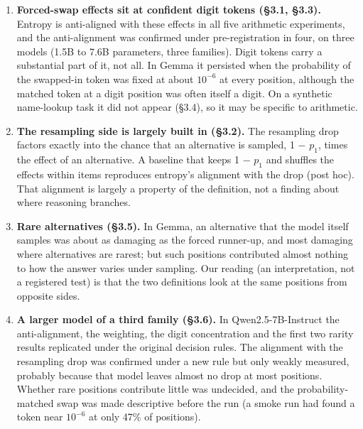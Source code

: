 \documentclass[
  10pt,
  a4paper,
]{article}
\providecommand{\tightlist}{%
  \setlength{\itemsep}{0pt}\setlength{\parskip}{0pt}}
\begin{document}
\begin{enumerate}
\def\labelenumi{\arabic{enumi}.}
\tightlist
\item
  \textbf{Forced-swap effects sit at confident digit tokens (§3.1, §3.3).} Entropy is anti-aligned with these effects in all five arithmetic experiments, and the anti-alignment was confirmed under
  pre-registration in four, on three models (1.5B to 7.6B parameters, three families). Digit tokens carry a substantial part of it, not all. In Gemma it persisted when the probability of the
  swapped-in token was fixed at about \(10^{-6}\) at every position, although the matched token at a digit position was often itself a digit. On a synthetic name-lookup task it did not appear (§3.4),
  so it may be specific to arithmetic.
\item
  \textbf{The resampling side is largely built in (§3.2).} The resampling drop factors exactly into the chance that an alternative is sampled, 1 − \(p_1\), times the effect of an alternative. A
  baseline that keeps 1 − \(p_1\) and shuffles the effects within items reproduces entropy's alignment with the drop (post hoc). That alignment is largely a property of the definition, not a finding
  about where reasoning branches.
\item
  \textbf{Rare alternatives (§3.5).} In Gemma, an alternative that the model itself samples was about as damaging as the forced runner-up, and most damaging where alternatives are rarest; but such
  positions contributed almost nothing to how the answer varies under sampling. Our reading (an interpretation, not a registered test) is that the two definitions look at the same positions from
  opposite sides.
\item
  \textbf{A larger model of a third family (§3.6).} In Qwen2.5-7B-Instruct the anti-alignment, the weighting, the digit concentration and the first two rarity results replicated under the original
  decision rules. The alignment with the resampling drop was confirmed under a new rule but only weakly measured, probably because that model leaves almost no drop at most positions. Whether rare
  positions contribute little was undecided, and the probability-matched swap was made descriptive before the run (a smoke run had found a token near \(10^{-6}\) at only 47\% of positions).
\end{enumerate}
\end{document}
